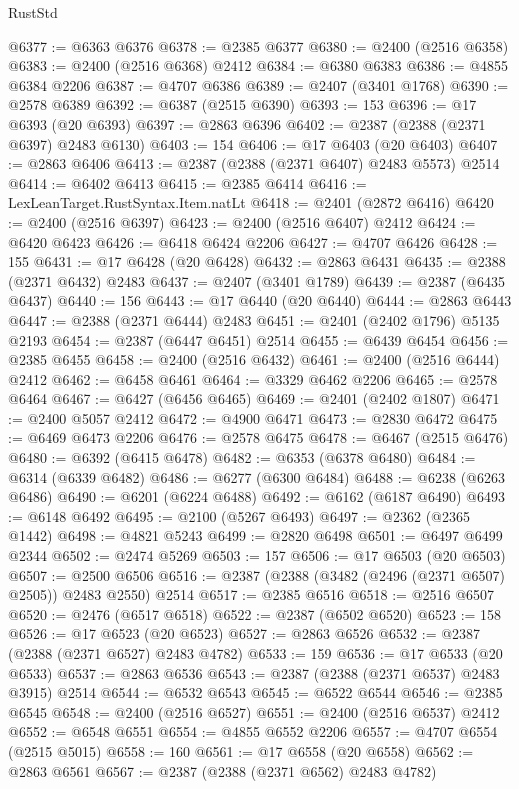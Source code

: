 \begin{lexlean}{RustStd}
\begin{coremodule}
@6377 := @6363 @6376
@6378 := @2385 @6377
@6380 := @2400 (@2516 @6358)
@6383 := @2400 (@2516 @6368) @2412
@6384 := @6380 @6383
@6386 := @4855 @6384 @2206
@6387 := @4707 @6386
@6389 := @2407 (@3401 @1768)
@6390 := @2578 @6389
@6392 := @6387 (@2515 @6390)
@6393 := 153
@6396 := @17 @6393 (@20 @6393)
@6397 := @2863 @6396
@6402 := @2387 (@2388 (@2371 @6397) @2483 @6130)
@6403 := 154
@6406 := @17 @6403 (@20 @6403)
@6407 := @2863 @6406
@6413 := @2387 (@2388 (@2371 @6407) @2483 @5573) @2514
@6414 := @6402 @6413
@6415 := @2385 @6414
@6416 := LexLeanTarget.RustSyntax.Item.natLt
@6418 := @2401 (@2872 @6416)
@6420 := @2400 (@2516 @6397)
@6423 := @2400 (@2516 @6407) @2412
@6424 := @6420 @6423
@6426 := @6418 @6424 @2206
@6427 := @4707 @6426
@6428 := 155
@6431 := @17 @6428 (@20 @6428)
@6432 := @2863 @6431
@6435 := @2388 (@2371 @6432) @2483
@6437 := @2407 (@3401 @1789)
@6439 := @2387 (@6435 @6437)
@6440 := 156
@6443 := @17 @6440 (@20 @6440)
@6444 := @2863 @6443
@6447 := @2388 (@2371 @6444) @2483
@6451 := @2401 (@2402 @1796) @5135 @2193
@6454 := @2387 (@6447 @6451) @2514
@6455 := @6439 @6454
@6456 := @2385 @6455
@6458 := @2400 (@2516 @6432)
@6461 := @2400 (@2516 @6444) @2412
@6462 := @6458 @6461
@6464 := @3329 @6462 @2206
@6465 := @2578 @6464
@6467 := @6427 (@6456 @6465)
@6469 := @2401 (@2402 @1807)
@6471 := @2400 @5057 @2412
@6472 := @4900 @6471
@6473 := @2830 @6472
@6475 := @6469 @6473 @2206
@6476 := @2578 @6475
@6478 := @6467 (@2515 @6476)
@6480 := @6392 (@6415 @6478)
@6482 := @6353 (@6378 @6480)
@6484 := @6314 (@6339 @6482)
@6486 := @6277 (@6300 @6484)
@6488 := @6238 (@6263 @6486)
@6490 := @6201 (@6224 @6488)
@6492 := @6162 (@6187 @6490)
@6493 := @6148 @6492
@6495 := @2100 (@5267 @6493)
@6497 := @2362 (@2365 @1442)
@6498 := @4821 @5243
@6499 := @2820 @6498
@6501 := @6497 @6499 @2344
@6502 := @2474 @5269
@6503 := 157
@6506 := @17 @6503 (@20 @6503)
@6507 := @2500 @6506
@6516 := @2387 (@2388 (@3482 (@2496 (@2371 @6507) @2505)) @2483 @2550) @2514
@6517 := @2385 @6516
@6518 := @2516 @6507
@6520 := @2476 (@6517 @6518)
@6522 := @2387 (@6502 @6520)
@6523 := 158
@6526 := @17 @6523 (@20 @6523)
@6527 := @2863 @6526
@6532 := @2387 (@2388 (@2371 @6527) @2483 @4782)
@6533 := 159
@6536 := @17 @6533 (@20 @6533)
@6537 := @2863 @6536
@6543 := @2387 (@2388 (@2371 @6537) @2483 @3915) @2514
@6544 := @6532 @6543
@6545 := @6522 @6544
@6546 := @2385 @6545
@6548 := @2400 (@2516 @6527)
@6551 := @2400 (@2516 @6537) @2412
@6552 := @6548 @6551
@6554 := @4855 @6552 @2206
@6557 := @4707 @6554 (@2515 @5015)
@6558 := 160
@6561 := @17 @6558 (@20 @6558)
@6562 := @2863 @6561
@6567 := @2387 (@2388 (@2371 @6562) @2483 @4782)

\end{coremodule}
\end{lexlean}
